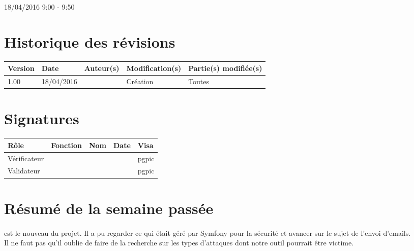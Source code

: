 \documentclass [a4paper] {article}
\begin{document}
18/04/2016			 				%
\hfill   
\hfill 	 9:00 - 9:50 				%


\section*{Historique des révisions}
\begin{center}
			\begin{tabular}{| p{2.5cm} | p{3cm} | p{3cm} | p{3cm} | p{3.5cm} |}
				\hline
				\rowcolor{Gray}
				Version & Date & Auteur(s) & Modification(s) & Partie(s) modifiée(s)		 \\
				\hline
				1.00 & 18/04/2016 & \Pierre & Création & Toutes \\
		\hline		
			\end{tabular}
		\end{center}

\section*{Signatures}

		\begin{center}
			\begin{tabular}{| p{2.5cm} | p{4cm} | p{3cm} | p{3cm} | p{2.5cm} |}
				\hline
				\rowcolor{Gray}
				Rôle & Fonction & Nom & Date & Visa		 \\
				\hline
				Vérificateur & \RQA & \Kafui &  & pgpic \\[30pt]
				\hline
				Validateur & \CP & \Sergi &  & pgpic \\[30pt]	
				\hline
			\end{tabular}
		\end{center}


\section{Résumé de la semaine passée}
\paragraph*{}
\Florian{} est le nouveau \RS{} du projet. Il a pu regarder ce qui était géré par Symfony pour la sécurité et avancer sur le sujet de l'envoi d'emails. \\
Il ne faut pas qu'il oublie de faire de la recherche sur les types d'attaques dont notre outil pourrait être victime.
\end{document}

